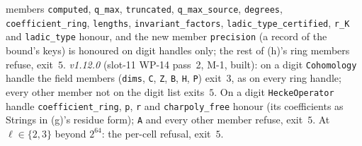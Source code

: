 \documentclass[11pt]{article}
\theoremstyle{remark}
\begin{document}
\begin{itemize}
  members \texttt{computed}, \texttt{q\_max}, \texttt{truncated}, \texttt{q\_max\_source},
  \texttt{degrees}, \texttt{coefficient\_ring}, \texttt{lengths}, \texttt{invariant\_factors},
  \texttt{ladic\_type\_certified}, \texttt{r\_K} and \texttt{ladic\_type} honour, and the new member
  \texttt{precision} (a record of the bound's keys) is honoured on digit handles only; the rest of
  (h)'s ring members refuse, exit~$5$. \emph{v1.12.0} (slot-11 WP-14 pass~2, M-1, built): on a digit
  \texttt{Cohomology} handle the field members (\texttt{dims}, \texttt{C}, \texttt{Z}, \texttt{B},
  \texttt{H}, \texttt{P}) exit~$3$, as on every ring handle; every other member not on the digit list
  exits~$5$. On a digit \texttt{HeckeOperator} handle
  \texttt{coefficient\_ring}, \texttt{p}, \texttt{r} and \texttt{charpoly\_free} honour (its
  coefficients as Strings in (g)'s residue form); \texttt{A} and every other member refuse, exit~$5$.
  At $\ell\in\{2,3\}$ beyond $2^{64}$: the per-cell refusal, exit~$5$.
\end{itemize}
\end{document}
